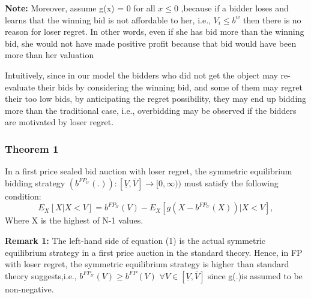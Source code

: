 \documentclass[10pt,a4paper,oneside]{report}
\begin{document}
\noindent \textbf{Note:} Moreover, assume g(x) = 0 for all $x \leq 0$ ,because if a bidder loses and learns that the winning bid is not affordable to her, i.e., $V_i\leq b^w$ then there is no reason for loser regret. In other words, even if she has bid more than the winning bid, she would not have made positive profit because that bid would have been more than her valuation

\noindent Intuitively, since in our model the bidders who did not get the object may re-evaluate their bids by considering the winning bid, and some of them may regret their too low bids, by anticipating the regret possibility, they may end up bidding more than the traditional case, i.e., overbidding may be observed if the bidders are motivated by loser regret.\citep{filizy2005auctions}
\subsubsection{Theorem 1}
In a first price sealed bid auction with loser regret, the symmetric equilibrium bidding strategy $(b^{{FP}_{lr}}(.)):[\underline{V} , \overline{V}] \to [0, \infty))$ must satisfy the following condition:\citep{filizy2005auctions}
\begin{equation}
E_X[X|X<V] = b^{{FP}_{lr}}(V)- E_X[g(X-b^{{FP}_{lr}}(X))|X<V],
\end{equation}
Where X is the highest of N-1 values.

\begin{flushleft}
\textbf{Remark 1:} The left-hand side of equation (1) is the actual symmetric equilibrium strategy in a first price auction in the standard theory. Hence, in FP with loser regret, the symmetric equilibrium strategy is higher than standard theory suggests,i.e., $b^{{FP}_{lr}}(V)\geq b^{{FP}}(V)$  $\forall  V\in [\underline{V},\overline{V}]$ since g(.)is assumed to be non-negative.
\end{flushleft}
\end{document}
